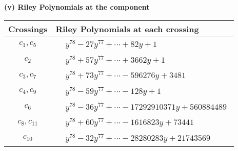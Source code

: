 \documentclass[1p]{elsarticle_modified}
\theoremstyle{definition}
\begin{document}
\flushleft \textbf{(v) Riley Polynomials at the component}\newline \\
\begin{tabular}{m{50pt}|m{274pt}}
Crossings & \hspace{64pt}Riley Polynomials at each crossing \\
\hline $$\begin{aligned}c_{1},c_{5}\end{aligned}$$&$\begin{aligned}
&y^{78}-27 y^{77}+\cdots+82 y+1
\end{aligned}$\\
\hline $$\begin{aligned}c_{2}\end{aligned}$$&$\begin{aligned}
&y^{78}+57 y^{77}+\cdots+3662 y+1
\end{aligned}$\\
\hline $$\begin{aligned}c_{3},c_{7}\end{aligned}$$&$\begin{aligned}
&y^{78}+73 y^{77}+\cdots-596276 y+3481
\end{aligned}$\\
\hline $$\begin{aligned}c_{4},c_{9}\end{aligned}$$&$\begin{aligned}
&y^{78}-59 y^{77}+\cdots-128 y+1
\end{aligned}$\\
\hline $$\begin{aligned}c_{6}\end{aligned}$$&$\begin{aligned}
&y^{78}-36 y^{77}+\cdots-17292910371 y+560884489
\end{aligned}$\\
\hline $$\begin{aligned}c_{8},c_{11}\end{aligned}$$&$\begin{aligned}
&y^{78}+60 y^{77}+\cdots-1616823 y+73441
\end{aligned}$\\
\hline $$\begin{aligned}c_{10}\end{aligned}$$&$\begin{aligned}
&y^{78}-32 y^{77}+\cdots-28280283 y+21743569
\end{aligned}$\\
\hline
\end{tabular}\\~\\
\end{document}
